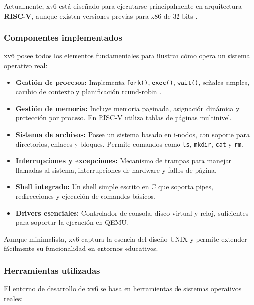 Actualmente, xv6 está diseñado para ejecutarse principalmente en arquitectura \textbf{RISC-V}, aunque existen versiones previas para x86 de 32 bits \cite{xv6_riscv}.

\subsubsection{Componentes implementados}

xv6 posee todos los elementos fundamentales para ilustrar cómo opera un sistema operativo real:

\begin{itemize}
    \item \textbf{Gestión de procesos:} Implementa \texttt{fork()}, \texttt{exec()}, \texttt{wait()}, señales simples, cambio de contexto y planificación round-robin \cite{xv6_book}.
    
    \item \textbf{Gestión de memoria:} Incluye memoria paginada, asignación dinámica y protección por proceso. En RISC-V utiliza tablas de páginas multinivel.

    \item \textbf{Sistema de archivos:} Posee un sistema basado en i-nodos, con soporte para directorios, enlaces y bloques. Permite comandos como \texttt{ls}, \texttt{mkdir}, \texttt{cat} y \texttt{rm}.

    \item \textbf{Interrupciones y excepciones:} Mecanismo de trampas para manejar llamadas al sistema, interrupciones de hardware y fallos de página.

    \item \textbf{Shell integrado:} Un shell simple escrito en C que soporta pipes, redirecciones y ejecución de comandos básicos.

    \item \textbf{Drivers esenciales:} Controlador de consola, disco virtual y reloj, suficientes para soportar la ejecución en QEMU.
\end{itemize}

Aunque minimalista, xv6 captura la esencia del diseño UNIX y permite extender fácilmente su funcionalidad en entornos educativos.

\subsubsection{Herramientas utilizadas}

El entorno de desarrollo de xv6 se basa en herramientas de sistemas operativos reales:

